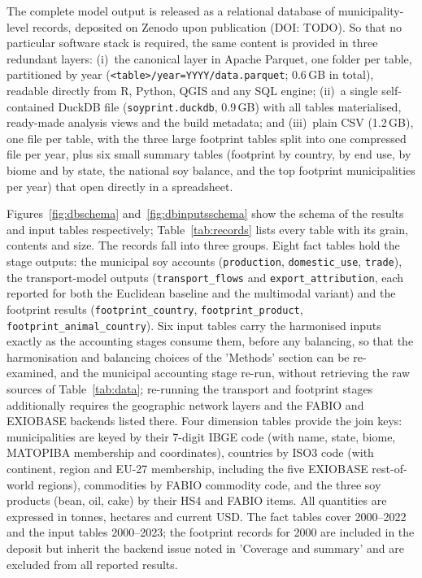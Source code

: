 \documentclass[pdflatex,sn-nature]{sn-jnl}%
\begin{document}
The complete model output is released as a relational database of
municipality-level records, deposited on Zenodo upon publication
(DOI: TODO). So that no particular software stack is required, the
same content is provided in three redundant layers: (i)~the canonical
layer in Apache Parquet, one folder per table, partitioned by year
(\texttt{<table>/year=YYYY/data.parquet}; 0.6\,GB in total), readable
directly from R, Python, QGIS and any SQL engine; (ii)~a single
self-contained DuckDB file (\texttt{soyprint.duckdb}, 0.9\,GB) with
all tables materialised, ready-made analysis views and the build
metadata; and (iii)~plain CSV (1.2\,GB), one file per table, with the
three large footprint tables split into one compressed file per year,
plus six small summary tables (footprint by country, by end use, by
biome and by state, the national soy balance, and the top footprint
municipalities per year) that open directly in a spreadsheet.

Figures~\ref{fig:dbschema} and~\ref{fig:dbinputsschema} show the
schema of the results and input tables respectively;
Table~\ref{tab:records} lists every table with its grain, contents and
size. The records fall into three groups. Eight fact tables hold the
stage outputs: the municipal soy accounts (\texttt{production},
\texttt{domestic\_use}, \texttt{trade}), the transport-model outputs
(\texttt{transport\_flows} and \texttt{export\_attribution}, each
reported for both the Euclidean baseline and the multimodal variant)
and the footprint results (\texttt{footprint\_country},
\texttt{footprint\_product}, \texttt{footprint\_animal\_country}).
Six input tables carry the harmonised inputs exactly as the accounting
stages consume them, before any balancing, so that the harmonisation
and balancing choices of the 'Methods' section can be re-examined, and
the municipal accounting stage re-run, without retrieving the raw
sources of Table~\ref{tab:data}; re-running the transport and
footprint stages additionally requires the geographic network layers
and the FABIO and EXIOBASE backends listed there. Four dimension tables provide
the join keys: municipalities are keyed by their 7-digit IBGE code
(with name, state, biome, MATOPIBA membership and coordinates),
countries by ISO3 code (with continent, region and EU-27 membership,
including the five EXIOBASE rest-of-world regions), commodities by
FABIO commodity code, and the three soy products (bean, oil, cake) by
their HS4 and FABIO items. All quantities are expressed in tonnes,
hectares and current USD. The fact tables cover 2000--2022 and the
input tables 2000--2023; the footprint records for 2000 are included
in the deposit but inherit the backend issue noted in 'Coverage and
summary' and are excluded from all reported results.
\end{document}
